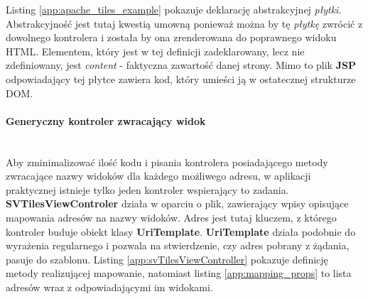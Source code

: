 	Listing \ref{app:apache_tiles_example} pokazuje deklarację abstrakcyjnej \textit{płytki}. Abstrakcyjność jest tutaj kwestią umowną ponieważ
	można by tę \textit{płytkę} zwrócić z dowolnego kontrolera i została by ona zrenderowana do poprawnego widoku HTML. Elementem, który jest w tej definicji
	zadeklarowany, lecz nie zdefiniowany, jest \textit{content} - faktyczna zawartość danej strony. Mimo to plik \textbf{JSP} odpowiadający tej płytce
	zawiera kod, który umieści ją w ostatecznej strukturze DOM. 
	
	
	\paragraph{Generyczny kontroler zwracający widok} \hspace{0pt} \\
	Aby zminimalizować ilość kodu i pisania kontrolera posiadającego metody zwracające nazwy widoków dla każdego możliwego adresu, w aplikacji praktycznej istnieje tylko jeden kontroler wspierający to zadania. \textbf{SVTilesViewControler} działa w oparciu o plik, zawierający wpisy opisujące mapowania adresów na nazwy widoków. Adres jest tutaj kluczem, z którego kontroler buduje obiekt klasy \textbf{UriTemplate}. \textbf{UriTemplate} działa podobnie do wyrażenia regularnego i pozwala na stwierdzenie, czy adres pobrany z żądania, pasuje do szablonu. Listing \ref{app:svTilesViewController} pokazuje definicję metody realizującej mapowanie, natomiast listing \ref{app:mapping_props} to lista adresów wraz z odpowiadającymi im widokami.
	\begin{code}
		\inputminted[
			linenos=true,
			firstline=50,
			lastline=61,
			fontfamily=monospace,
			obeytabs=true,
			samepage=true,
			fontsize=\scriptsize
		]{java}{\SpringatomScrPath{/webmvc/controllers/SVTilesViewController.java}}
		\caption[Generyczny kontroler zwracający nazwy widoków]{
			Generyczny kontroler zwracający nazwy widoków zdefiniowanych w pliku \ref{app:mapping_props}, źródło: opracowanie własne
		}
		\label{app:svTilesViewController}
	}
	\end{code}
		 
